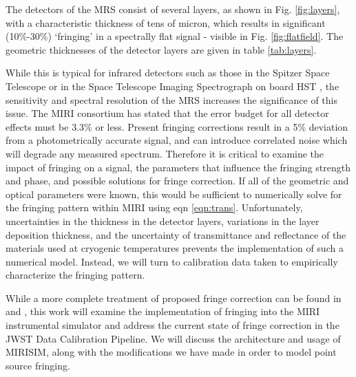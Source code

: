 The detectors of the MRS consist of several layers, as shown in Fig. \ref{fig:layers}, with a characteristic thickness of tens of micron, which results in significant (10\%-30\%) `fringing' in a spectrally flat signal - visible in Fig. \ref{fig:flatfield}.
The geometric thicknesses of the detector layers are given in table \ref{tab:layers}.

While this is typical for infrared detectors such as those in the Spitzer Space Telescope \parencite{Lahuis2003} or in the Space Telescope Imaging Spectrograph on board HST \parencite{Malumuth2003}, the sensitivity and spectral resolution of the MRS increases the significance of this issue.
The MIRI consortium has stated that the error budget for all detector effects must be 3.3\% or less. 
Present fringing corrections result in a 5\% deviation from a photometrically accurate signal, and can introduce correlated noise which will degrade any measured spectrum.
Therefore it is critical to examine the impact of fringing on a signal, the parameters that influence the fringing strength and phase, and possible solutions for fringe correction. 
If all of the geometric and optical parameters were known, this would be sufficient to numerically solve for the fringing pattern within MIRI using eqn \ref{eqn:trans}. 
Unfortunately, uncertainties in the thickness in the detector layers, variations in the layer deposition thickness, and the uncertainty of transmittance and reflectance of the materials used at cryogenic temperatures prevents the implementation of such a numerical model.
Instead, we will turn to calibration data taken to empirically characterize the fringing pattern.

While a more complete treatment of proposed fringe correction can be found in \parencite{Argyriou2020} and \parencite{Lahuis2018}, this work will examine the implementation of fringing into the MIRI instrumental simulator and address the current state of fringe correction in the JWST Data Calibration Pipeline.
We will discuss the architecture and usage of MIRISIM, along with the modifications we have made in order to model point source fringing.


